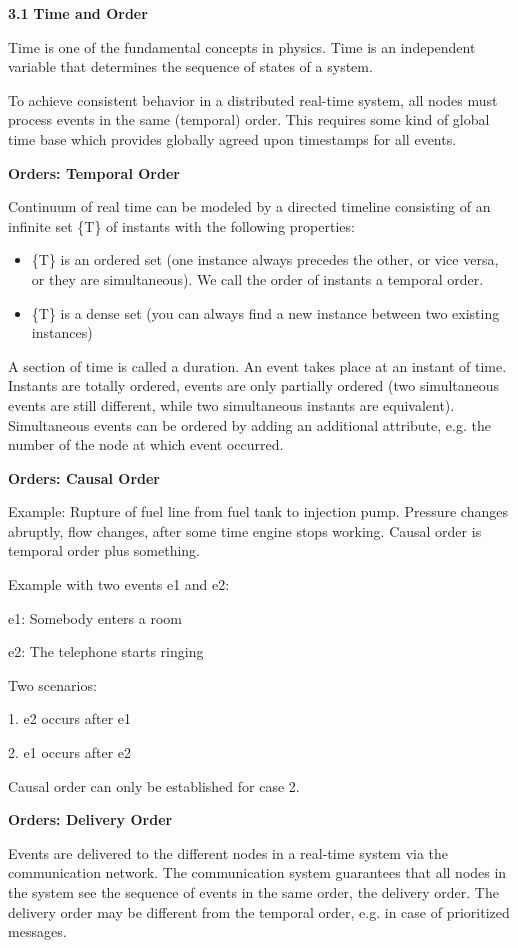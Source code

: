 \textbf{3.1} \protect\hypertarget{teil2}{}{}\textbf{Time and Order}

Time is one of the fundamental concepts in physics. Time is an
independent variable that determines the sequence of states of a system.

To achieve consistent behavior in a distributed real-time system, all
nodes must process events in the same (temporal) order. This requires
some kind of global time base which provides globally agreed upon
timestamps for all events.

\textbf{Orders: Temporal Order}

Continuum of real time can be modeled by a directed timeline consisting
of an infinite set \{T\} of instants with the following properties:

\begin{itemize}
\item
  \{T\} is an ordered set (one instance always precedes the other, or
  vice versa, or they are simultaneous). We call the order of instants a
  temporal order.
\item
  \{T\} is a dense set (you can always find a new instance between two
  existing instances)
\end{itemize}

A section of time is called a duration. An event takes place at an
instant of time. Instants are totally ordered, events are only partially
ordered (two simultaneous events are still different, while two
simultaneous instants are equivalent). Simultaneous events can be
ordered by adding an additional attribute, e.g. the number of the node
at which event occurred.

\textbf{Orders: Causal Order}

Example: Rupture of fuel line from fuel tank to injection pump. Pressure
changes abruptly, flow changes, after some time engine stops working.
Causal order is temporal order plus something.

Example with two events e1 and e2:

e1: Somebody enters a room

e2: The telephone starts ringing

Two scenarios:

1. e2 occurs after e1

2. e1 occurs after e2

Causal order can only be established for case 2.

\textbf{Orders: Delivery Order}

Events are delivered to the different nodes in a real-time system via
the communication network. The communication system guarantees that all
nodes in the system see the sequence of events in the same order, the
delivery order. The delivery order may be different from the temporal
order, e.g. in case of prioritized messages.

